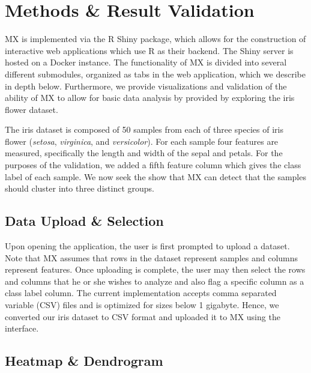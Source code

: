 \documentclass[twoside,leqno,twocolumn]{article}
\begin{document}
\section{Methods \& Result Validation}
\label{sec:meth}

MX is implemented via the R Shiny package, which allows for the construction of interactive web applications which use R as their backend. The Shiny server is hosted on a Docker instance. The functionality of MX is divided into several different submodules, organized as tabs in the web application, which we  describe in depth below. Furthermore, we provide visualizations and validation of the ability of MX to allow for basic data analysis by provided by exploring the iris flower dataset. 

The iris dataset is composed of 50 samples from each of three species of iris flower (\textit{setosa}, \textit{virginica}, and \textit{versicolor}). For each sample four features are measured, specifically the length and width of the sepal and petals. For the purposes of the validation, we added a fifth feature column which gives the class label of each sample. We now seek the show that MX can detect that the samples should cluster into three distinct groups.

\subsection{Data Upload \& Selection}
\label{subsec:SubSecUpload}

Upon opening the application, the user is first prompted to upload a dataset. Note that MX assumes that rows in the dataset represent samples and columns represent features. Once uploading is complete, the user may then select the rows and columns that he or she wishes to analyze and also flag a specific column as a class label column. The current implementation accepts comma separated variable (CSV) files and is optimized for sizes below 1 gigabyte. Hence, we converted our iris dataset to CSV format and uploaded it to MX using the interface.

\subsection{Heatmap \& Dendrogram}
\label{subsec:SubSecHeatmap}
\end{document}
